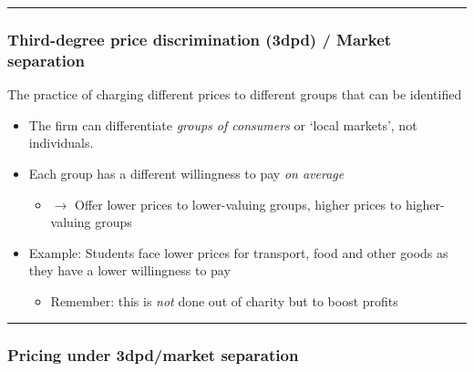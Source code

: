 \documentclass[]{article}
\providecommand{\tightlist}{%
  \setlength{\itemsep}{0pt}\setlength{\parskip}{0pt}}
\begin{document}
\begin{center}\rule{0.5\linewidth}{\linethickness}\end{center}

\hypertarget{third-degree-price-discrimination-3dpd-market-separation}{%
\subsubsection{Third-degree price discrimination (3dpd) / Market
separation}\label{third-degree-price-discrimination-3dpd-market-separation}}

\begin{description}
\tightlist
\item[Third-degree price discrimination/Market-separation]
The practice of charging different prices to different groups that can
be identified
\end{description}

\begin{itemize}
\tightlist
\item
  The firm can differentiate \emph{groups of consumers} or `local
  markets', not individuals.
\item
  Each group has a different willingness to pay \emph{on average}

  \begin{itemize}
  \tightlist
  \item
    \(\rightarrow\) Offer lower prices to lower-valuing groups, higher
    prices to higher-valuing groups
  \end{itemize}
\end{itemize}

\begin{itemize}
\tightlist
\item
  Example: Students face lower prices for transport, food and other
  goods as they have a lower willingness to pay

  \begin{itemize}
  \tightlist
  \item
    Remember: this is \emph{not} done out of charity but to boost
    profits
  \end{itemize}
\end{itemize}

\begin{center}\rule{0.5\linewidth}{\linethickness}\end{center}

\hypertarget{pricing-under-3dpdmarket-separation}{%
\subsubsection{Pricing under 3dpd/market
separation}\label{pricing-under-3dpdmarket-separation}}
\end{document}

